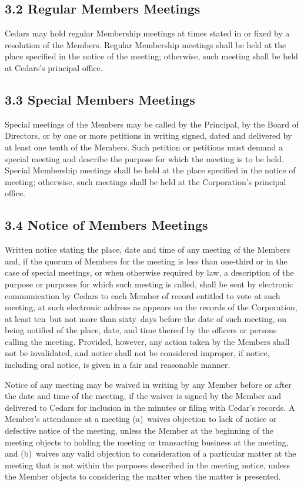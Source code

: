 \documentclass[
]{book}
\begin{document}
\subsection{3.2 Regular Members Meetings}\label{regular-members-meetings}

Cedars may hold regular Membership meetings at times stated in or
fixed by a resolution of the Members. Regular Membership meetings
shall be held at the place specified in the notice of the meeting;
otherwise, such meeting shall be held at Cedars's principal office.

\subsection{3.3 Special Members Meetings}\label{special-members-meetings}

Special meetings of the Members may be called by the Principal, by the
Board of Directors, or by one or more petitions in writing signed,
dated and delivered by at least one tenth of the Members. Such
petition or petitions must demand a special meeting and describe the
purpose for which the meeting is to be held. Special Membership
meetings shall be held at the place specified in the notice of
meeting; otherwise, such meetings shall be held at the Corporation's
principal office.

\subsection{3.4 Notice of Members Meetings}\label{notice-of-members-meetings}

Written notice stating the place, date and time of any meeting of the
Members and, if the quorum of Members for the meeting is less than
one‑third or in the case of special meetings, or when otherwise
required by law, a description of the purpose or purposes for which
such meeting is called, shall be sent by electronic communication by
Cedars to each Member of record entitled to vote at such meeting, at
such electronic address as appears on the records of the Corporation,
at least ten~but not more than sixty~days before the date of such
meeting, on being notified of the place, date, and time thereof by the
officers or persons calling the meeting. Provided, however, any action
taken by the Members shall not be invalidated, and notice shall not be
considered improper, if notice, including oral notice, is given in a
fair and reasonable manner.

Notice of any meeting may be waived in writing by any Member before or
after the date and time of the meeting, if the waiver is signed by the
Member and delivered to Cedars for inclusion in the minutes or filing
with Cedar's records. A Member's attendance at a meeting (a)~waives
objection to lack of notice or defective notice of the meeting, unless
the Member at the beginning of the meeting objects to holding the
meeting or transacting business at the meeting, and (b)~waives any
valid objection to consideration of a particular matter at the meeting
that is not within the purposes described in the meeting notice,
unless the Member objects to considering the matter when the matter is
presented.
\end{document}
